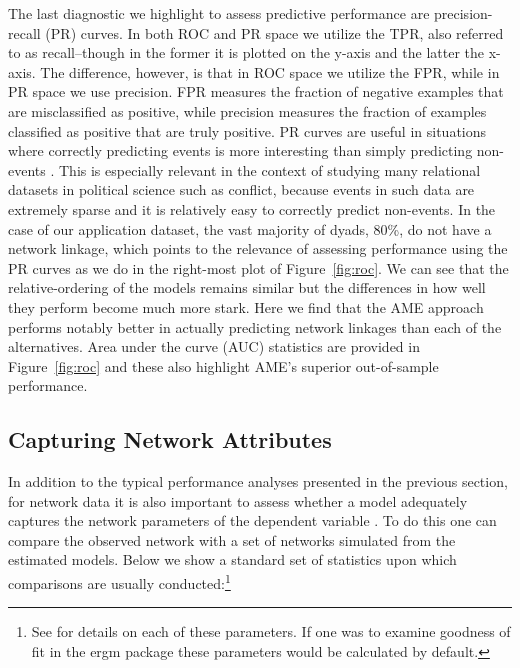 \documentclass[12pt,onesided,pdflatex]{amsart}
\newcommand{\pkg}[1]{{\fontseries{b}\selectfont #1}}
\begin{document}
The last diagnostic we highlight to assess predictive performance are precision-recall (PR) curves. In both ROC and PR space we utilize the TPR, also referred to as recall--though in the former it is plotted on the y-axis and the latter the x-axis. The difference, however, is that in ROC space we utilize the FPR, while in PR space we use precision. FPR measures the fraction of negative examples that are misclassified as positive, while precision measures the fraction of examples classified as positive that are truly positive. PR curves are useful in situations where correctly predicting events is more interesting than simply predicting non-events \citep{davis:goadrich:2006}. This is especially relevant in the context of studying many relational datasets in political science such as conflict, because events in such data are extremely sparse and it is relatively easy to correctly predict non-events. In the case of our application dataset, the vast majority of dyads, 80\%, do not have a network linkage, which points to the relevance of assessing performance using the PR curves as we do in the right-most plot of Figure~\ref{fig:roc}. We can see that the relative-ordering of the models remains similar but the differences in how well they perform become much more stark. Here we find that the AME approach performs notably better in actually predicting network linkages than each of the alternatives. Area under the curve (AUC) statistics are provided in Figure~\ref{fig:roc} and these also highlight AME's superior out-of-sample performance.

\subsection{Capturing Network Attributes}

In addition to the typical performance analyses presented in the previous section, for network data it is also important to assess whether a model adequately captures the network parameters of the dependent variable \citep{hunter:etal:2008}. To do this one can compare the observed network with a set of networks simulated from the estimated models. Below we show a standard set of statistics upon which comparisons are usually conducted:\footnote{See \citet{morris:etal:2008} for details on each of these parameters. If one was to examine goodness of fit in the \pkg{ergm} package these parameters would be calculated by default.}
\end{document}
